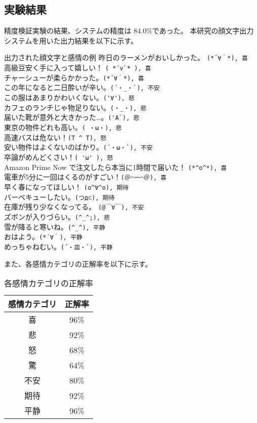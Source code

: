 \documentclass[11pt,a4j]{jsarticle}
\begin{document}
  \subsection{実験結果}
精度検証実験の結果、システムの精度は 84.0\%であった。
本研究の顔文字出力システムを用いた出力結果を以下に示す。

\begin{itembox}[l]{出力された顔文字と感情の例}
  昨日のラーメンがおいしかった。 \verb|(*´∀｀*), 喜| \\
高級豆安く手に入って嬉しい！ \verb|( *´v`* ), 喜| \\
チャーシューが柔らかかった。\verb|(*´∀｀*), 喜|\\
この年になると二日酔いが辛い。\verb|(´・_・`), 不安|\\
この服はあまりかわいくない。\verb|('∀'), 悲|\\
カフェのランチじゃ物足りない。\verb|(・_・), 悲|\\
届いた靴が意外と大きかった…。\verb|('A`), 悲|\\
東京の物件どれも高い。\verb|( ・ω・), 悲|\\
高速バスは危ない！\verb|(T ^ T), 怒|\\
安い物件はよくないのばかり。\verb|(´・ω・`), 不安|\\
卒論がめんどくさい！\verb|( 'ω' ), 怒|\\
Amazon Prime Now で注文したら本当に1時間で届いた！ \verb|(*^o^*), 喜|\\
電車が5分に一回はくるのがすごい！\verb|(＠⌒ー⌒＠), 喜|\\
早く春になってほしい！ \verb|(o^∀^o), 期待|\\
バーベキューしたい。\verb|(つд⊂), 期待|\\
在庫が残り少なくなってる。 \verb|(@￣∀￣), 不安|\\
ズボンが入りづらい。\verb|(^_^;), 悲|\\
雪が降ると寒いね。\verb|(^_^), 平静|\\
おはよう。\verb|(*´∀｀), 平静|\\
めっちゃねむい。\verb|(´・皿・`), 平静|\\
\end{itembox}

また、各感情カテゴリの正解率を以下に示す。

\begin{table}
  \caption{各感情カテゴリの正解率}
  \centering
  \begin{tabular}{|c|c|} \hline
    感情カテゴリ & 正解率 \\ \hline \hline
    喜 & 96\% \\ \hline
    悲 & 92\% \\  \hline
    怒 & 68\% \\ \hline
    驚 & 64\% \\ \hline
    不安 & 80\% \\ \hline
    期待 & 92\% \\ \hline
    平静 & 96\% \\ \hline
  \end{tabular}
\end{table}
\end{document}
